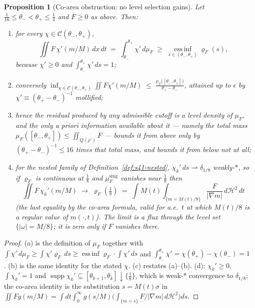 \documentclass[11pt]{article}
\newtheorem{proposition}[theorem]{Proposition}
\theoremstyle{definition}
\theoremstyle{remark}
\begin{document}
\begin{proposition}[Co-area obstruction: no level selection gains]
  \label{prop:s41-coarea}
  Let $\tfrac1{16}\leq\theta_-<\theta_+\leq\tfrac14$ and
  $F\geq0$ as above. Then:
  \begin{enumerate}[label=(\alph*)]
    \item for every $\chi\in\mathcal{C}(\theta_-,\theta_+)$,
      \[
        \iint F\,\chi'(m/M)\,dx\,dt \;=\; \int_{\theta_-}^{\theta_+}\chi'\,d\mu_F
        \;\geq\; \operatorname*{ess\,inf}_{s\in(\theta_-,\theta_+)}\varrho_F(s),
      \]
      because $\chi'\geq0$ and $\int_{\theta_-}^{\theta_+}\chi'\,ds=1$;
    \item conversely
      $\displaystyle\inf_{\chi\in\mathcal{C}(\theta_-,\theta_+)}
       \iint F\chi'(m/M)
       \;\leq\;\frac{\mu_F\bigl([\theta_-,\theta_+]\bigr)}{\theta_+-\theta_-}$,
      attained up to $\epsilon$ by $\chi'\equiv(\theta_+-\theta_-)^{-1}$
      mollified;
    \item hence the residual produced by \emph{any} admissible cutoff is a
      \emph{level density} of $\mu_F$, and the only a priori information
      available about it --- namely the total mass
      $\mu_F([\theta_-,\theta_+])\leq\iint_{Q(\rho')}F$ --- bounds it from
      above only by $(\theta_+-\theta_-)^{-1}\leq16$ times that total mass,
      and bounds it from below not at all;
    \item for the nested family of Definition~\ref{def:s41-nested},
      $\chi_k'\,ds\rightharpoonup\delta_{1/8}$ weakly-$*$, so if $\varrho_F$
      is continuous at $\tfrac18$ and $\mu_F^{\mathrm{sing}}$ vanishes near
      $\tfrac18$ then
      \[
        \iint F\,\chi_k'(m/M)\;\longrightarrow\;\varrho_F(\tfrac18)
        \;=\;\int \!M(t)\!\!\int_{\{m=M(t)/8\}}\frac{F}{|\nabla m|}
          \,d\mathcal{H}^2\,dt
      \]
      (the last equality by the co-area formula, valid for a.e.\ $t$ at
      which $M(t)/8$ is a regular value of $m(\cdot,t)$). The limit is a
      \emph{flux through the level set} $\{|\omega|=M/8\}$; it is zero only
      if $F$ vanishes there.
  \end{enumerate}
\end{proposition}
\begin{proof}
  (a) is the definition of $\mu_F$ together with
  $\int\chi'\,d\mu_F\geq\int\chi'\varrho_F\,ds
  \geq\operatorname{ess\,inf}\varrho_F\cdot\int\chi'\,ds$ and
  $\int_{\theta_-}^{\theta_+}\chi'=\chi(\theta_+)-\chi(\theta_-)=1$.
  (b) is the same identity for the stated $\chi$.
  (c) restates (a)--(b).
  (d): $\chi_k'\geq0$, $\int\chi_k'=1$ and
  $\operatorname{supp}\chi_k'\subseteq[\theta_{k+1},\theta_k]\downarrow\{\tfrac18\}$,
  which is weak-$*$ convergence to $\delta_{1/8}$; the co-area identity is
  the substitution $s=M(t)\sigma$ in
  $\iint F g(m/M)=\int\!dt\int_0^\infty g(s/M)
  \bigl(\int_{\{m=s\}}F/|\nabla m|\,d\mathcal{H}^2\bigr)ds$.
\end{proof}
\end{document}

